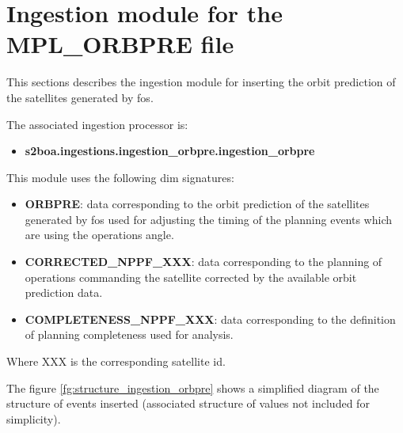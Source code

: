 \section{Ingestion module for the MPL\_ORBPRE file}

This sections describes the ingestion module for inserting the orbit prediction of the satellites generated by \acrshort{fos}.

The associated ingestion processor is:

\begin{itemize} 

\item \textbf{s2boa.ingestions.ingestion\_orbpre.ingestion\_orbpre}
  
\end{itemize}

This module uses the following \acrshort{dim} signatures:

\begin{itemize} 

\item \textbf{ORBPRE}: data corresponding to the orbit prediction of the satellites generated by \acrshort{fos} used for adjusting the timing of the planning events which are using the operations angle.

\item \textbf{CORRECTED\_NPPF\_XXX}: data corresponding to the planning of operations commanding the satellite corrected by the available orbit prediction data.

\item \textbf{COMPLETENESS\_NPPF\_XXX}: data corresponding to the definition of planning completeness used for analysis.
  
\end{itemize}

Where XXX is the corresponding satellite id.

The figure \ref{fg:structure_ingestion_orbpre} shows a simplified diagram of the structure of events inserted (associated structure of values not included for simplicity).

